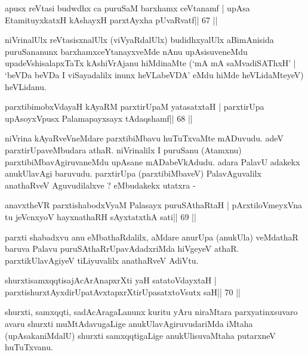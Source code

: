 
\begin{shl}
apusx reVtasi budwdhx ca puruSaM barxhamx ceVtanamf |
upAsa EtamituyxkatxH kAshayxH parxtAyxha pUvaRvatf\hfill || 67 ||
\end{shl}

\begin{artha}
niVrinalUlx reVtasisxnalUlx (viVyaRdalUlx) budidhxyalUlx aBimAnisida  puruSa\-nanunx barxhamxceYtanayxveMde nAnu upAsisuveneMdu  upadeVshisalapxTaTx kAshiVrAjanu hiMdinaMte (`mA mA saMvadiSAThxH' | `beVDa beVDa I viSayadalilx inunx heVLabeVDA' eMdu hiMde heVLidaMteyeV) heVLidanu.
\end{artha}


\begin{shl}
parxtibimobxVdayaH kAyaRM parxtirUpaM yatasatxtaH |
parxtirUpa upAsoyxV\s pusx Palamapayxsayx tAdaqshamf\hfill || 68 ||
\end{shl}

\begin{artha}
niVrina kAyaRveVneMdare parxtibiMbavu huTuTxvaMte mADuvudu. adeV parxti\-rUpaveMbudara athaR. niVrinalilx I puruSanu (Atamxnu) parxtibiMbavAgiruvaneMdu upAsane mADabeVkAdudu. adara PalavU adakekx anukUlavAgi baruvudu. parxtirUpa (parxtibiMbaveV) PalavAguvalilx anathaRveV Aguvudilalxve ? eMbudakekx utatxra - 
\end{artha}

\begin{shl}
anavxtheVR parxtishabodxV\s yaM Palasayx puruSAthaRtaH |
pArxtiloVmeyxVna tu jeVcnxyoV hayxnathaRH sAyxtatxthA sati\hfill || 69 ||
\end{shl}

\begin{artha}
parxti shabadxvu anu eMbathaRdalilx, aMdare anurUpa (anukUla) veMdathaR  baruva Palavu puruSAthaRrUpavAdadxriMda hiVgeyeV athaR. parxtikUlavAgiyeV tiLiyuvalilx anathaRveV AdiVtu.
\end{artha}

\begin{shl}
shurxtisamxqqtisajAcArAnapxrXti yaH satatoVdayxtaH |
parxtishurxtAyxdirUpatAvxtapxrXtirUpasatxtoV\s sutx saH\hfill || 70 ||
\end{shl}

\begin{artha}
shurxti, samxqqti, sadAcAragaLanunx kuritu yAru niraMtara parxyatinxsuvaro avaru shurxti muMtAdavugaLige anukUlavAgiruvudariMda iMtaha (upAsakaniMdalU) shurxti samxqqtigaLige anukUlisuvaMtaha putarxneV huTuTxvanu.
\end{artha}

